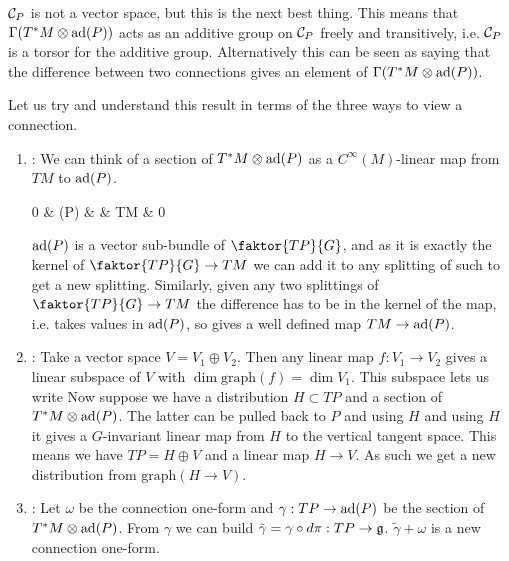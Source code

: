 \documentclass{article}
\begin{document}
\begin{remark}
	$\mathcal{C}_P$ is not a vector space, but this is the next best thing. This means that $\Gamma(T^\ast M \otimes \operatorname{ad}(P))$ acts as an additive group on $\mathcal{C}_P$ freely and transitively, i.e. $\mathcal{C}_P$ is a torsor for the additive group. Alternatively this can be seen as saying that the difference between two connections gives an element of $\Gamma(T^\ast M \otimes \operatorname{ad}(P))$. 
\end{remark}

Let us try and understand this result in terms of the three ways to view a connection. 
\begin{enumerate}
	\item {}: We can think of a section of $T^\ast M \otimes \operatorname{ad}(P)$ as a $C^\infty(M)$-linear map from $TM$ to $\operatorname{ad}(P)$. 
	\begin{tkz}
		0 \arrow[r] & \ad(P) \arrow[r] &  \arrow[r] & TM \arrow[r] \arrow[ll,dashed, bend left=20] & 0 
	\end{tkz}
$\operatorname{ad}(P)$ is a vector sub-bundle of $\faktor{TP}{G}$, and as it is exactly the kernel of $\faktor{TP}{G} \to TM$ we can add it to any splitting of such to get a new splitting. Similarly, given any two splittings of $\faktor{TP}{G} \to TM$ the difference has to be in the kernel of the map, i.e. takes values in $\operatorname{ad}(P)$, so gives a well defined map $TM \to \operatorname{ad}(P)$. 
\item {}: Take a vector space $V=V_1 \oplus V_2$. Then any linear map $f:V_1 \to V_2$ gives a linear subspace of $V$ 
with $\dim \text{graph}(f) = \dim V_1$. This subspace lets us write 
Now suppose we have a distribution $H \subset TP$ and a section of $T^\ast M \otimes \operatorname{ad}(P)$. The latter can be pulled back to $P$ and using $H$ and using $H$ it gives a $G$-invariant linear map from $H$ to the vertical tangent space. This means we have $TP = H \oplus V$ and a linear map $H \to V$. As such we get a new distribution from $\text{graph}(H \to V)$. 
\item {}: Let $\omega$ be the connection one-form and $\gamma:TP \to \operatorname{ad}(P)$ be the section of $T^\ast M \otimes \operatorname{ad}(P)$. From $\gamma$ we can build $\tilde{\gamma} = \gamma \circ d\pi : TP \to \mathfrak{g}$. $\tilde{\gamma} + \omega$ is a new connection one-form. 
\end{enumerate}
\end{document}
